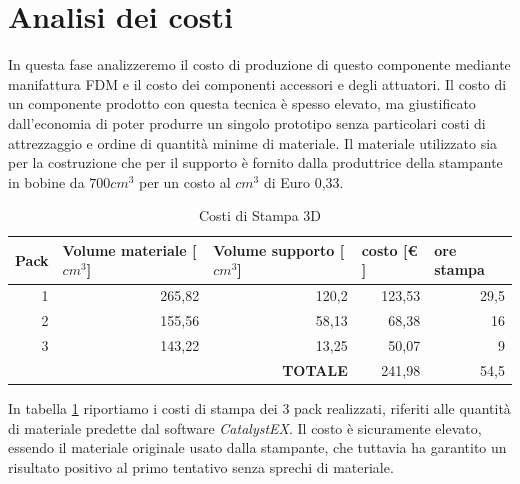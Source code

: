 \documentclass[%
corpo=11pt,
twoside,
 stile=classica,
oldstyle,
greek,%
]{toptesi}
\begin{document}
	
	\section{Analisi dei costi}
	In questa fase analizzeremo il costo di produzione di questo componente mediante manifattura FDM e il costo dei componenti accessori e degli attuatori. 
	Il costo di un componente prodotto con questa tecnica è spesso elevato, ma giustificato dall'economia di poter produrre un singolo prototipo senza particolari costi di attrezzaggio e ordine di quantità minime di materiale. 
	Il materiale utilizzato sia per la costruzione che per il supporto è fornito dalla produttrice della stampante in bobine da $700 cm^3$ per un costo al $cm^3$ di Euro 0,33. 
	\begin{table}[H]
		\centering
		\caption{Costi di Stampa 3D}
		\begin{tabular}{rr|r|r|r|}
			\hline
			\multicolumn{1}{|l|}{\textbf{Pack}} & \multicolumn{1}{l|}{\textbf{Volume materiale [$cm^{3}$]}} & \multicolumn{1}{l|}{\textbf{Volume supporto [$cm^{3}$]}} & \multicolumn{1}{l|}{\textbf{costo [€ ]}} & \multicolumn{1}{l|}{\textbf{ore stampa}} \bigstrut\\
			\hline
			\multicolumn{1}{|r|}{1} & 265,82 & 120,2 & 123,53 & 29,5 \bigstrut\\
			\hline
			\multicolumn{1}{|r|}{2} & 155,56 & 58,13 & 68,38 & 16 \bigstrut\\
			\hline
			\multicolumn{1}{|r|}{3} & 143,22 & 13,25 & 50,07 & 9 \bigstrut\\
			\hline
			&       & \textbf{TOTALE} & 241,98 & 54,5 \bigstrut\\
			\cline{3-5}    \end{tabular}%
		\label{tab:printcost}%
	\end{table}%
	In tabella \ref{tab:printcost} riportiamo i costi di stampa dei 3 pack realizzati, riferiti alle quantità di materiale predette dal software \textit{CatalystEX}. Il costo è sicuramente elevato, essendo il materiale originale usato dalla stampante, che tuttavia ha garantito un risultato positivo al primo tentativo senza sprechi di materiale. 
	
\end{document}
